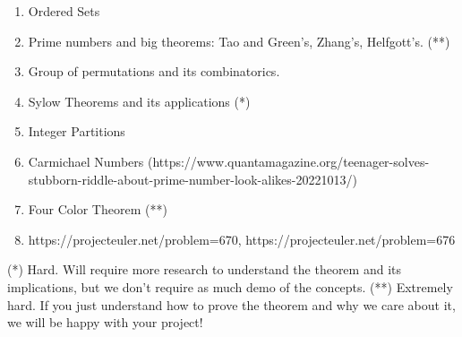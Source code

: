 \documentclass{article}
\begin{document}
\begin{enumerate}[label = \arabic*.]
    \item Ordered Sets
        
    \item Prime numbers and big theorems: Tao and Green's, Zhang's, Helfgott's. (**)
    \item Group of permutations and its combinatorics.
        
    \item Sylow Theorems and its applications (*)
        
    \item Integer Partitions
        
    \item Carmichael Numbers (https://www.quantamagazine.org/teenager-solves-stubborn-riddle-about-prime-number-look-alikes-20221013/)
        
    \item Four Color Theorem (**)
        
    \item https://projecteuler.net/problem=670, https://projecteuler.net/problem=676
\end{enumerate}

(*) Hard. Will require more research to understand the theorem and its implications, but we don't require as much demo of the concepts.
(**) Extremely hard. If you just understand how to prove the theorem and why we care about it, we will be happy with your project!
\end{document}
